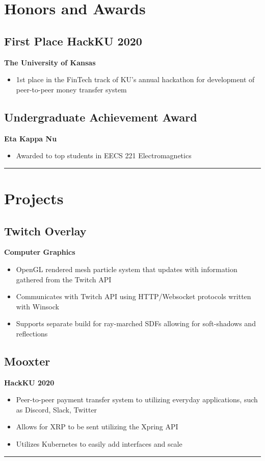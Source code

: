 \documentclass[11pt, letterpaper]{article}
\newenvironment{desItemize}
{ \begin{itemize}[leftmargin=*, topsep=1pt]
    \setlength{\itemsep}{0pt}
    \setlength{\parskip}{0pt}
    \setlength{\parsep}{0pt}
    \small     }
{ \end{itemize}                  }
\newcommand{\columnRule}{
    \noindent\hspace{-0.5\columnsep}\rule{\columnwidth + \columnsep/2}{1pt}\noindent
}
\newenvironment{rightSection}[1]
{\section*{#1}}
{\columnRule}
\begin{document}
\begin{multicols*}{2}[]
\begin{rightSection}{Honors and Awards}
    \subsection*{First Place HackKU 2020}
    \textbf{The University of Kansas}
    \begin{desItemize}
    \item 1st place in the FinTech track of KU’s annual hackathon for development of peer-to-peer money transfer system
    \end{desItemize}
    \subsection*{Undergraduate Achievement Award}
    \textbf{Eta Kappa Nu}
    \begin{desItemize}
    \item Awarded to top students in EECS 221 Electromagnetics
    \end{desItemize}
\end{rightSection}
\begin{rightSection}{Projects}
    \subsection*{Twitch Overlay}
    \textbf{Computer Graphics}
    \begin{desItemize}
    \item OpenGL rendered mesh particle system that updates with information gathered from the Twitch API
    \item Communicates with Twitch API using HTTP/Websocket protocols written with Winsock 
    \item Supports separate build for ray-marched SDFs allowing for soft-shadows and reflections
    \end{desItemize}
    \subsection*{Mooxter}
    \textbf{HackKU 2020}
    \begin{desItemize}
    \item Peer-to-peer payment transfer system to utilizing everyday applications, such as Discord, Slack, Twitter
    \item Allows for XRP to be sent utilizing the Xpring API
    \item Utilizes Kubernetes to easily add interfaces and scale
    \end{desItemize}
\end{rightSection}
\end{multicols*}
\end{document}
